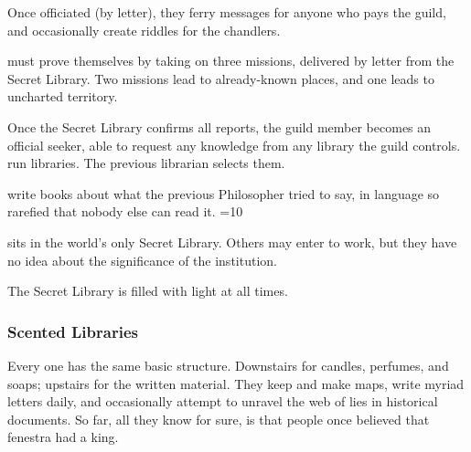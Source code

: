 \begin{multicols}{2}
\begin{description}
  Once officiated (by letter), they ferry messages for anyone who pays the guild, and occasionally create riddles for the chandlers.
  \item[\Glspl{seeker}]
  must prove themselves by taking on three missions, delivered by letter from the Secret Library.
  Two missions lead to already-known places, and one leads to uncharted territory.

  Once the Secret Library confirms all reports, the guild member becomes an official \gls{seeker}, able to request any knowledge from any library the guild controls.
  run libraries.
  The previous librarian selects them.
  \item[Philosophers]
  write books about what the previous Philosopher tried to say, in language so rarefied that nobody else can read it.
  \ifnum\value{season}=10
  \item[The Last Librarian]
  sits in the world's only Secret Library.
  Others may enter to work, but they have no idea about the significance of the institution.

  The Secret Library is filled with light at all times.
  \fi
\end{description}

\subsubsection{Scented Libraries}

Every one has the same basic structure.
Downstairs for candles, perfumes, and soaps; upstairs for the written material.
They keep and make maps, write myriad letters daily, and occasionally attempt to unravel the web of lies in historical documents.
So far, all they know for sure, is that people once believed that \gls{fenestra} had a king.

\end{multicols}

